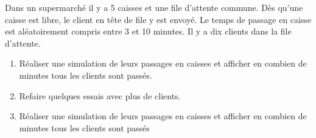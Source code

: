 \documentclass[12pt,fleqn]{article} %
\begin{document}
\begin{exercise}
	Dans un supermarché il y a 5 caisses et une file d’attente commune. Dès qu’une caisse est libre, le client en tête de file y est
	envoyé. Le temps de passage en caisse est aléatoirement compris entre 3 et 10 minutes. Il y a dix clients dans la file d’attente.
	\begin{enumerate}
		\item Réaliser une simulation de leurs passages en caisses et afficher en combien de minutes tous les clients sont passés.
		\item  Refaire quelques essais avec plus de clients.
		\item Réaliser une simulation de leurs passages en caisses et afficher en combien de minutes tous les clients sont passés
	\end{enumerate}
\end{exercise}
\end{document}
